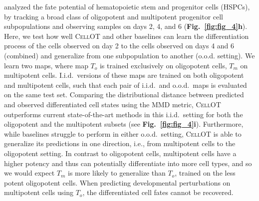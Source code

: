 \citet{weinreb2020lineage} analyzed the fate potential of hematopoietic stem and progenitor cells (HSPCs), by tracking a broad class of oligopotent %
and multipotent %
progenitor cell subpopulations and observing samples on days 2, 4, and 6 (\textbf{Fig.~\ref{fig:fig_4}h}).
Here, we test how well \textsc{CellOT} and other baselines can learn the differentiation process of the cells observed on day 2 to the cells observed on days 4 and 6 (combined) and generalize from one subpopulation to another (o.o.d. setting).
We learn two maps, where map $T_o$ is trained exclusively on oligopotent cells, $T_m$ on multipotent cells.
I.i.d.~versions of these maps are trained on both oligopotent and multipotent cells, such that each pair of i.i.d.~and o.o.d.~maps is evaluated on the same test set.
Comparing the distributional distance between predicted and observed differentiated cell states using the MMD metric, \textsc{CellOT} outperforms current state-of-the-art methods in this i.i.d.~setting for both the oligopotent and the multipotent subsets (see \textbf{Fig.~\ref{fig:fig_4}i}).
Furthermore, while baselines struggle to perform in either o.o.d.~setting, \textsc{CellOT} is able to generalize its predictions in one direction, i.e., from multipotent cells to the oligopotent setting.
In contrast to oligopotent cells, multipotent cells have a higher potency and thus can potentially differentiate into more cell types, and so we would expect $T_m$ is more likely to generalize than $T_o$, trained on the less potent oligopotent cells.
When predicting developmental perturbations on multipotent cells using $T_o$, the differentiated cell fates cannot be recovered.



